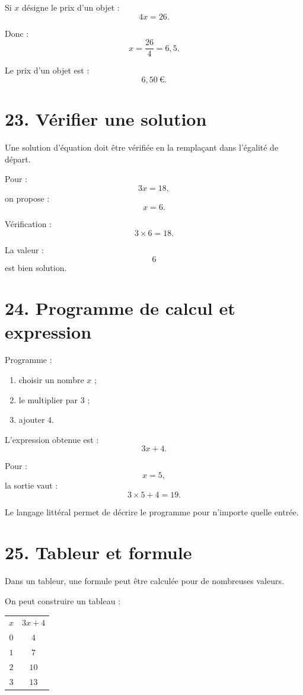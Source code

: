 Si $x$ désigne le prix d'un objet :
\[
4x=26.
\]

Donc :
\[
x=\dfrac{26}{4}=6{,}5.
\]

Le prix d'un objet est :
\[
\boxed{6{,}50\ \text{€}}.
\]

\section{23. Vérifier une solution}

Une solution d'équation doit être vérifiée en la remplaçant dans l'égalité de départ.

Pour :
\[
3x=18,
\]
on propose :
\[
x=6.
\]

Vérification :
\[
3\times6=18.
\]

La valeur :
\[
6
\]
est bien solution.

\section{24. Programme de calcul et expression}

Programme :
\begin{enumerate}
\item choisir un nombre $x$ ;
\item le multiplier par $3$ ;
\item ajouter $4$.
\end{enumerate}

L'expression obtenue est :
\[
3x+4.
\]

Pour :
\[
x=5,
\]
la sortie vaut :
\[
3\times5+4=19.
\]

Le langage littéral permet de décrire le programme pour n'importe quelle entrée.

\section{25. Tableur et formule}

Dans un tableur, une formule peut être calculée pour de nombreuses valeurs.

On peut construire un tableau :

\begin{tabular}{c|c}
$x$ & $3x+4$ \\
$0$ & $4$ \\
$1$ & $7$ \\
$2$ & $10$ \\
$3$ & $13$ \\
\end{tabular}

